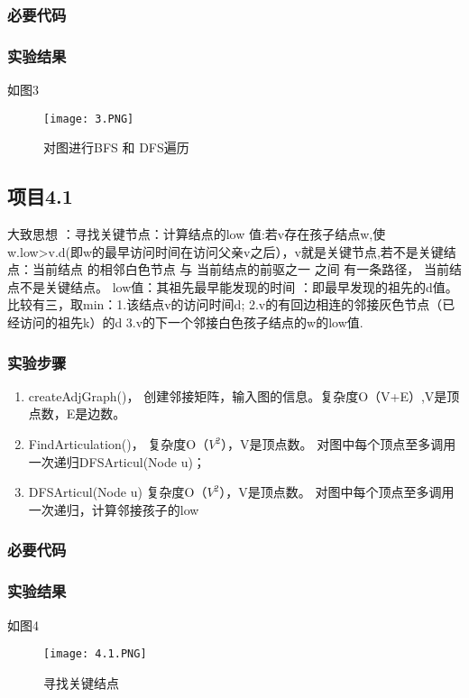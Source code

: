 \subsubsection{必要代码}


\subsubsection{实验结果}如图3
	\begin{figure}[!bthp]
	\centering
        \texttt{[image: 3.PNG]}
        \caption{对图进行BFS 和 DFS遍历}
      \end{figure}


\subsection{项目4.1}
大致思想 ：寻找关键节点：计算结点的low 值:若v存在孩子结点w,使 w.low>v.d(即w的最早访问时间在访问父亲v之后），v就是关键节点,若不是关键结点：当前结点 的相邻白色节点 与 当前结点的前驱之一 之间 有一条路径， 当前结点不是关键结点。
low值：其祖先最早能发现的时间 ：即最早发现的祖先的d值。比较有三，取min：1.该结点v的访问时间d;   2.v的有回边相连的邻接灰色节点（已经访问的祖先k）的d   3.v的下一个邻接白色孩子结点的w的low值.
\subsubsection{实验步骤}
\begin{enumerate}
\item createAdjGraph()， 创建邻接矩阵，输入图的信息。复杂度O（V+E）,V是顶点数，E是边数。
\item FindArticulation()， 复杂度O（$V^2$），V是顶点数。             对图中每个顶点至多调用一次递归DFSArticul(Node u)；
\item DFSArticul(Node u)  复杂度O（$V^2$），V是顶点数。              对图中每个顶点至多调用一次递归，计算邻接孩子的low      
\end{enumerate}
\subsubsection{必要代码}


\subsubsection{实验结果}如图4
	\begin{figure}[!bthp]
	\centering
        \texttt{[image: 4.1.PNG]}
        \caption{寻找关键结点}
      \end{figure}


